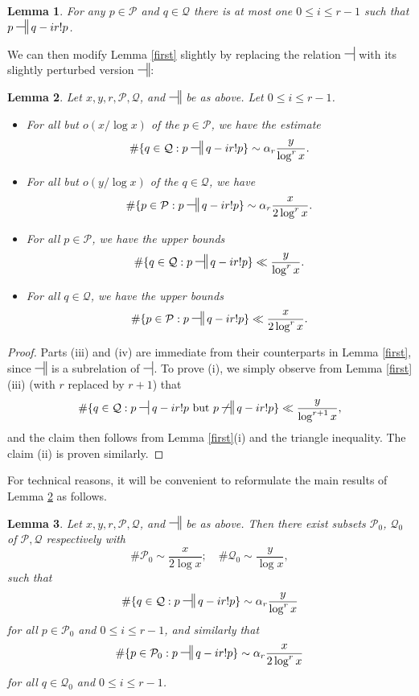\documentclass[12pt]{amsart}
\numberwithin{equation}{section}  %
\theoremstyle{remark}
\theoremstyle{plain}
\newtheorem{lem}{Lemma}[section]
\numberwithin{equation}{section}
\renewcommand{\leq}{\leqslant}
\renewcommand{\(}{\left(}
\renewcommand{\)}{\right)}
\newcommand{\asym}{\sim}   %
\newcommand{\rel}{\nsststile{}{}}  %
\newcommand{\relr}{\nsdtstile{}{}} %
\newcommand{\PP}{\mathcal{P}}
\newcommand{\QQ}{\mathcal{Q}}
\begin{document}
\begin{lem}\label{disj} For any $p \in \PP$ and $q \in \QQ$ there is at most one $0 \leq i \leq r-1$ such that $p \relr q - ir!p$.
\end{lem}

We can then modify Lemma \ref{first} slightly by replacing the relation $\rel$ with its slightly perturbed version $\relr$:

\begin{lem}\label{Q0-a}  Let $x,y,r,\PP,\QQ$, and $\relr$ be as above.   Let $0 \leq i \leq r-1$.
\begin{itemize}
\item[(i)] For all but $o(x/\log x)$ of the $p \in \PP$, we have the estimate
\[ \# \{ q \in \QQ: p \relr q-ir!p \} \asym  \alpha_r \frac{y}{\log^r x}.\]
\item[(ii)] For all but $o(y/\log x)$ of the $q \in \QQ$, we have
\[ \# \{ p \in \PP : p \relr q-ir!p \} \asym  \alpha_r  \frac{x}{2\log^r x}.\]
\item[(iii)]  For \emph{all} $p \in \PP$, we have the upper bounds
\[ \# \{ q \in \QQ: p \relr q-ir!p \} \ll \frac{y}{\log^r x}.\]
\item[(iv)]  For \emph{all} $q \in \QQ$, we have the upper bounds
\[ \# \{ p \in \PP : p \relr q-ir!p \} \ll \frac{x}{2\log^r x}.\]
\end{itemize}
\end{lem}

\begin{proof}  Parts (iii) and (iv) are immediate from their counterparts in Lemma \ref{first}, since $\relr$ is a subrelation of $\rel$.  To prove (i), we simply observe from Lemma \ref{first}(iii) (with $r$ replaced by $r+1$) that
\[ \# \{ q \in \QQ: p \rel q-ir!p \hbox{ but } p \not \relr q-ir!p \} \ll \frac{y}{\log^{r+1} x},\]
and the claim then follows from Lemma \ref{first}(i) and the triangle inequality.  The claim (ii) is proven similarly.
\end{proof}

For technical reasons, it will be convenient to reformulate the main results of Lemma \ref{Q0-a} as follows.

\begin{lem}\label{Q0}  Let $x,y,r,\PP,\QQ$, and $\relr$ be as above.   Then there exist subsets $\PP_0$, $\QQ_0$ of $\PP, \QQ$ respectively with
\begin{equation}\label{pq0}
\# \PP_0 \asym \frac{x}{2\log x}; \quad \# \QQ_0 \asym \frac{y}{\log x},
\end{equation}
such that
\begin{equation}\label{q0-i}
 \# \{ q \in \QQ: p \relr q-ir!p \} \asym  \alpha_r \frac{y}{\log^r x}
\end{equation}
for \emph{all} $p \in \PP_0$ and $0 \leq i \leq r-1$, and similarly that
\begin{equation}\label{q0-ii}
 \# \{ p \in \PP_0 : p \relr q-ir!p \} \asym  \alpha_r  \frac{x}{2\log^r x}
\end{equation}
for \emph{all} $q \in \QQ_0$ and $0 \leq i \leq r-1$.
\end{lem}
\end{document}
